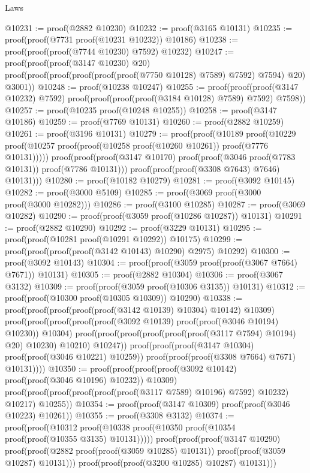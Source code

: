 \begin{lexlean}{Laws}
\begin{coremodule}
@10231 := proof(@2882 @10230)
@10232 := proof(@3165 @10131)
@10235 := proof(proof(@7731 proof(@10231 @10232)) @10186)
@10238 := proof(proof(proof(@7744 @10230) @7592) @10232)
@10247 := proof(proof(proof(@3147 @10230) @20)
      proof(proof(proof(proof(proof(proof(@7750 @10128) @7589) @7592) @7594) @20) @3001))
@10248 := proof(@10238 @10247)
@10255 := proof(proof(proof(@3147 @10232) @7592)
      proof(proof(proof(proof(@3184 @10128) @7589) @7592) @7598))
@10257 := proof(@10235 proof(@10248 @10255))
@10258 := proof(@3147 @10186)
@10259 := proof(@7769 @10131)
@10260 := proof(@2882 @10259)
@10261 := proof(@3196 @10131)
@10279 := proof(proof(@10189
        proof(@10229 proof(@10257 proof(proof(@10258 proof(@10260 @10261)) proof(@7776 @10131)))))
      proof(proof(proof(@3147 @10170) proof(proof(@3046 proof(@7783 @10131)) proof(@7786 @10131)))
          proof(proof(proof(@3308 @7643) @7646) @10131)))
@10280 := proof(@10182 @10279)
@10281 := proof(@3092 @10145)
@10282 := proof(@3000 @5109)
@10285 := proof(@3069 proof(@3000 proof(@3000 @10282)))
@10286 := proof(@3100 @10285)
@10287 := proof(@3069 @10282)
@10290 := proof(proof(@3059 proof(@10286 @10287)) @10131)
@10291 := proof(@2882 @10290)
@10292 := proof(@3229 @10131)
@10295 := proof(proof(@10281 proof(@10291 @10292)) @10175)
@10299 := proof(proof(proof(proof(@3142 @10143) @10290) @2975) @10292)
@10300 := proof(@3092 @10143)
@10304 := proof(proof(@3059 proof(proof(@3067 @7664) @7671)) @10131)
@10305 := proof(@2882 @10304)
@10306 := proof(@3067 @3132)
@10309 := proof(proof(@3059 proof(@10306 @3135)) @10131)
@10312 := proof(proof(@10300 proof(@10305 @10309)) @10290)
@10338 := proof(proof(proof(proof(proof(@3142 @10139) @10304) @10142) @10309)
      proof(proof(proof(proof(proof(@3092 @10139) proof(proof(@3046 @10194) @10230)) @10304)
            proof(proof(proof(proof(proof(proof(@3117 @7594) @10194) @20) @10230) @10210) @10247))
          proof(proof(proof(@3147 @10304) proof(proof(@3046 @10221) @10259))
              proof(proof(proof(@3308 @7664) @7671) @10131))))
@10350 := proof(proof(proof(proof(@3092 @10142) proof(proof(@3046 @10196) @10232)) @10309)
      proof(proof(proof(proof(proof(proof(@3117 @7589) @10196) @7592) @10232) @10217) @10255))
@10354 := proof(proof(@3147 @10309) proof(proof(@3046 @10223) @10261))
@10355 := proof(@3308 @3132)
@10374 := proof(proof(@10312
        proof(@10338 proof(@10350 proof(@10354 proof(proof(@10355 @3135) @10131)))))
      proof(proof(proof(@3147 @10290)
            proof(proof(@2882 proof(proof(@3059 @10285) @10131)) proof(proof(@3059 @10287) @10131)))
          proof(proof(proof(@3200 @10285) @10287) @10131)))

\end{coremodule}
\end{lexlean}
